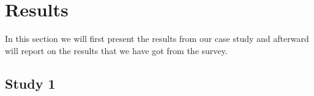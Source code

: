 \chapter{Results}
In this section we will first present the results from our case study and afterward will report on the results that we have got from the survey.

\section{Study 1}
